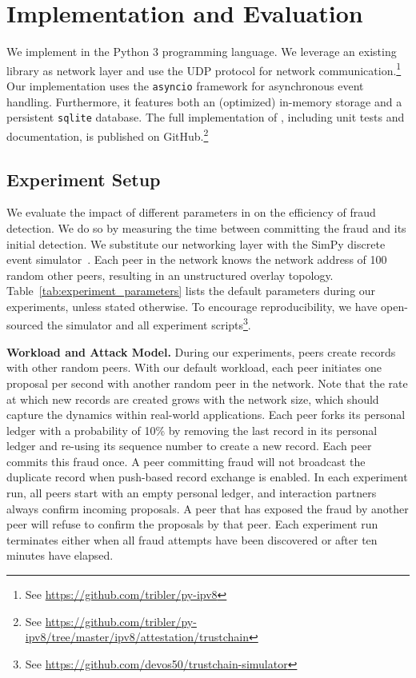 \section{Implementation and Evaluation}
\label{sec:implementation_evaluation}
We implement \ModelName{} in the Python 3 programming language.
We leverage an existing library as network layer and use the UDP protocol for network communication.\footnote{See \url{https://github.com/tribler/py-ipv8}}
Our implementation uses the \texttt{asyncio} framework for asynchronous event handling.
Furthermore, it features both an (optimized) in-memory storage and a persistent \texttt{sqlite} database.
The full implementation of \ModelName{}, including unit tests and documentation, is published on GitHub.\footnote{See \url{https://github.com/tribler/py-ipv8/tree/master/ipv8/attestation/trustchain}}

\subsection{Experiment Setup}
We evaluate the impact of different parameters in \ModelName{} on the efficiency of fraud detection.
We do so by measuring the time between committing the fraud and its initial detection.
We substitute our networking layer with the SimPy discrete event simulator~\cite{matloff2008introduction}.
Each peer in the \ModelName{} network knows the network address of 100 random other peers, resulting in an unstructured overlay topology.
Table~\ref{tab:experiment_parameters} lists the default parameters during our experiments, unless stated otherwise.
To encourage reproducibility, we have open-sourced the \ModelName{} simulator and all experiment scripts\footnote{See \url{https://github.com/devos50/trustchain-simulator}}.

\textbf{Workload and Attack Model.}
During our experiments, peers create records with other random peers.
With our default workload, each peer initiates one proposal per second with another random peer in the network.
Note that the rate at which new records are created grows with the network size, which should capture the dynamics within real-world applications.
Each peer forks its personal ledger with a probability of 10\% by removing the last record in its personal ledger and re-using its sequence number to create a new record.
Each peer commits this fraud once.
A peer committing fraud will not broadcast the duplicate record when push-based record exchange is enabled.
In each experiment run, all peers start with an empty personal ledger, and interaction partners always confirm incoming proposals.
A peer that has exposed the fraud by another peer will refuse to confirm the proposals by that peer.
Each experiment run terminates either when all fraud attempts have been discovered or after ten minutes have elapsed.

